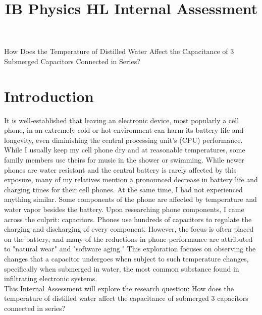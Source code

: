 \documentclass[12pt]{article}
\title{IB Physics HL Internal Assessment}
\date{\vspace{-2.85cm}}
\numberwithin{equation}{section}
\begin{document}
\maketitle
{\LARGE{How Does the Temperature of Distilled Water Affect the Capacitance of 3 Submerged Capacitors Connected in Series?}}
\section{Introduction}
\noindent It is well-established that leaving an electronic device, most popularly a cell phone, in an extremely cold or hot environment can harm its battery life and longevity, even diminishing the central processing unit's (CPU) performance. While I usually keep my cell phone dry and at reasonable temperatures, some family members use theirs for music in the shower or swimming. While newer phones are water resistant and the central battery is rarely affected by this exposure, many of my relatives mention a pronounced decrease in battery life and charging times for their cell phones. At the same time, I had not experienced anything similar. Some components of the phone are affected by temperature and water vapor besides the battery. Upon researching phone components, I came across the culprit: capacitors. Phones use hundreds of capacitors to regulate the charging and discharging of every component. However, the focus is often placed on the battery, and many of the reductions in phone performance are attributed to "natural wear" and "software aging." This exploration focuses on observing the changes that a capacitor undergoes when subject to such temperature changes, specifically when submerged in water, the most common substance found in infiltrating electronic systems.\\
\noindent This Internal Assessment will explore the research question: How does the temperature of distilled water affect the capacitance of submerged 3 capacitors connected in series? 
\end{document}
